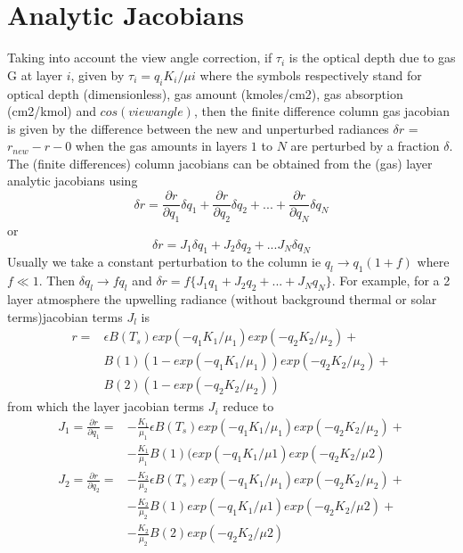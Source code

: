 \documentclass[12pt]{article}
\begin{document}
\section{Analytic Jacobians}
Taking into account the view angle correction, if $\tau_{i}$ is the optical 
depth due to gas G at layer $i$, given by $\tau_{i} = q_{i} K_{i}/\mu{i}$ 
where the symbols respectively stand for optical depth (dimensionless), gas 
amount (kmoles/cm2), gas absorption (cm2/kmol) and $cos(view angle)$, then 
the finite difference column gas jacobian is 
given by the difference between the new and unperturbed radiances 
$\delta r$ = $r_{new} - r-{0}$ when the gas amounts in layers $1$ to $N$ are 
perturbed by a fraction $\delta$. The (finite differences) column jacobians 
can be obtained from the (gas) layer analytic jacobians using
\[
\delta r = \frac{\partial r}{\partial q_1} \delta q_1 + 
           \frac{\partial r}{\partial q_2} \delta q_2 + ... + 
           \frac{\partial r}{\partial q_N} \delta q_N
\] 
or 
\[
\delta r = J_{1} \delta q_1 + J_{2} \delta q_2 + ...
               J_{N} \delta q_N
\]
Usually we take a constant perturbation to the column ie $q_{l} \rightarrow 
q_{1}(1 + f)$ where $f \ll 1$. Then $\delta q_{l} \rightarrow f q_{l}$ and
$\delta r = f \{ J_{1} q_1 + J_{2} q_2 + ... + J_{N} q_N \} $. For example, 
for a 2 layer atmosphere the upwelling radiance (without background thermal 
or solar terms)jacobian terms $J_{l}$ is 
\begin{eqnarray*}
r = & \epsilon B(T_{s}) exp(-q_{1} K_{1}/\mu_{1})exp(-q_{2} K_{2}/\mu_{2}) +\\
    & B(1)(1-exp(-q_{1} K_{1}/\mu_{1}))exp(-q_{2} K_{2}/\mu_{2}) + \\
    & B(2)(1-exp(-q_{2} K_{2}/\mu_{2}))
\end{eqnarray*}
from which the layer jacobian terms $J_{i}$ reduce to
\begin{eqnarray*}
J_{1} = \frac{\partial r}{\partial q_1} = & 
 -\frac{K_1}{\mu_1}\epsilon B(T_{s})exp(-q_1 K_1/\mu_1)exp(-q_2 K_2/\mu_2) + \\
&-\frac{K_1}{\mu_1} B(1)(exp(-q_{1} K_{1}/\mu{1})exp(-q_{2} K_{2}/\mu{2})
\end{eqnarray*}
\begin{eqnarray*}
J_{2} = \frac{\partial r}{\partial q_2} = & 
-\frac{K_2}{\mu_2}\epsilon B(T_{s})exp(-q_1 K_1/\mu_1)exp(-q_2 K_2/\mu_2) + \\
& -\frac{K_2}{\mu_2} B(1)exp(-q_{1} K_{1}/\mu{1})exp(-q_{2} K_{2}/\mu{2}) + \\
& -\frac{K_2}{\mu_2} B(2)exp(-q_{2} K_{2}/\mu{2})
\end{eqnarray*}
\end{document}
